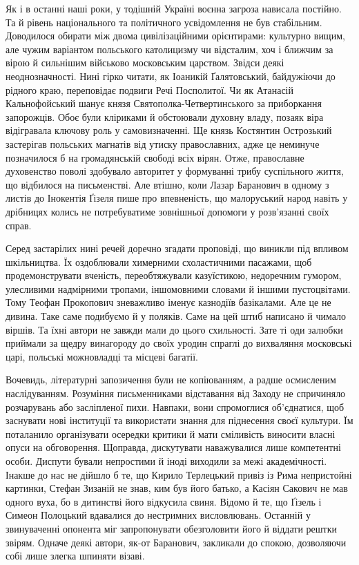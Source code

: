 Як і в останні наші роки, у тодішній Україні воєнна загроза нависала постійно.
Та й рівень національного та політичного усвідомлення не був стабільним.
Доводилося обирати між двома цивілізаційними орієнтирами: культурно вищим, але
чужим варіантом польського католицизму чи відсталим, хоч і ближчим за вірою й
сильнішим військово московським царством. Звідси деякі неоднозначності. Нині
гірко читати, як Іоаникій Ґалятовський, байдужіючи до рідного краю, переповідає
подвиги Речі Посполитої. Чи як Атанасій Кальнофойський шанує князя
Святополка-Четвертинського за приборкання запорожців. Обоє були кліриками й
обстоювали духовну владу, позаяк віра відігравала ключову роль у
самовизначенні. Ще князь Костянтин Острозький застерігав польських магнатів від
утиску православних, адже це неминуче позначилося б на громадянській свободі
всіх вірян. Отже, православне духовенство поволі здобувало авторитет у
формуванні трибу суспільного життя, що відбилося на письменстві. Але втішно,
коли Лазар Баранович в одному з листів до Інокентія Ґізеля пише про
впевненість, що малоруський народ навіть у дрібницях колись не потребуватиме
зовнішньої допомоги у розв’язанні своїх справ.

Серед застарілих нині речей доречно згадати проповіді, що виникли під впливом
шкільництва. Їх оздоблювали химерними схоластичними пасажами, щоб
продемонструвати вченість, переобтяжували казуїстикою, недоречним гумором,
улесливими надмірними тропами, іншомовними словами й іншими пустоцвітами. Тому
Теофан Прокопович зневажливо іменує казнодіїв базікалами. Але це не дивина.
Таке саме подибуємо й у поляків. Саме на цей штиб написано й чимало віршів. Та
їхні автори не завжди мали до цього схильності. Зате ті оди залюбки приймали за
щедру винагороду до своїх уродин спраглі до вихваляння московські царі,
польські можновладці та місцеві багатії.

Вочевидь, літературні запозичення були не копіюванням, а радше осмисленим
наслідуванням. Розуміння письменниками відставання від Заходу не спричиняло
розчарувань або засліпленої пихи. Навпаки, вони спромоглися об’єднатися, щоб
заснувати нові інституції та використати знання для піднесення своєї культури.
Їм поталанило організувати осередки критики й мати сміливість виносити власні
опуси на обговорення. Щоправда, дискутувати наважувалися лише компетентні
особи. Диспути бували непростими й іноді виходили за межі академічності. Інакше
до нас не дійшло б те, що Кирило Терлецький привіз із Рима непристойні
картинки, Стефан Зизаній не знав, ким був його батько, а Касіян Сакович не мав
одного вуха, бо в дитинстві його відкусила свиня. Відомо й те, що Ґізель і
Симеон Полоцький вдавалися до нестримних висловлювань. Останній у звинуваченні
опонента міг запропонувати обезголовити його й віддати рештки звірям. Одначе
деякі автори, як-от Баранович, закликали до спокою, дозволяючи собі лише злегка
шпиняти візаві.

